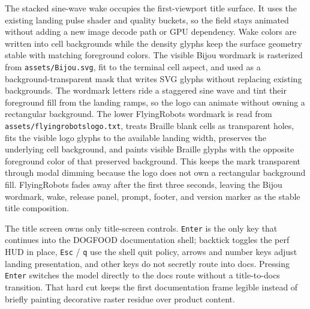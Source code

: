 The stacked sine-wave wake occupies the first-viewport title surface. It uses the existing landing pulse shader and quality buckets, so the field stays animated without adding a new image decode path or GPU dependency. Wake colors are written into cell backgrounds while the density glyphs keep the surface geometry stable with matching foreground colors. The visible Bijou wordmark is rasterized from \texttt{a\allowbreak{}s\allowbreak{}s\allowbreak{}e\allowbreak{}t\allowbreak{}s\allowbreak{}/\allowbreak{}B\allowbreak{}i\allowbreak{}j\allowbreak{}o\allowbreak{}u\allowbreak{}.\allowbreak{}s\allowbreak{}v\allowbreak{}g}, fit to the terminal cell aspect, and used as a background-transparent mask that writes SVG glyphs without replacing existing backgrounds. The wordmark letters ride a staggered sine wave and tint their foreground fill from the landing ramps, so the logo can animate without owning a rectangular background. The lower FlyingRobots wordmark is read from \texttt{a\allowbreak{}s\allowbreak{}s\allowbreak{}e\allowbreak{}t\allowbreak{}s\allowbreak{}/\allowbreak{}f\allowbreak{}l\allowbreak{}y\allowbreak{}i\allowbreak{}n\allowbreak{}g\allowbreak{}r\allowbreak{}o\allowbreak{}b\allowbreak{}o\allowbreak{}t\allowbreak{}s\allowbreak{}l\allowbreak{}o\allowbreak{}g\allowbreak{}o\allowbreak{}.\allowbreak{}t\allowbreak{}x\allowbreak{}t}, treats Braille blank cells as transparent holes, fits the visible logo glyphs to the available landing width, preserves the underlying cell background, and paints visible Braille glyphs with the opposite foreground color of that preserved background. This keeps the mark transparent through modal dimming because the logo does not own a rectangular background fill. FlyingRobots fades away after the first three seconds, leaving the Bijou wordmark, wake, release panel, prompt, footer, and version marker as the stable title composition.

The title screen owns only title-screen controls. \texttt{E\allowbreak{}n\allowbreak{}t\allowbreak{}e\allowbreak{}r} is the only key that continues into the DOGFOOD documentation shell; backtick toggles the perf HUD in place, \texttt{E\allowbreak{}s\allowbreak{}c} / \texttt{q} use the shell quit policy, arrows and number keys adjust landing presentation, and other keys do not secretly route into docs. Pressing \texttt{E\allowbreak{}n\allowbreak{}t\allowbreak{}e\allowbreak{}r} switches the model directly to the docs route without a title-to-docs transition. That hard cut keeps the first documentation frame legible instead of briefly painting decorative raster residue over product content.

